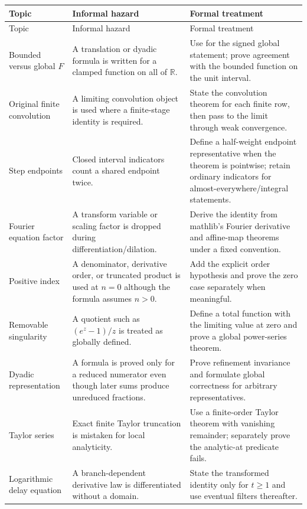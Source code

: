 \documentclass[11pt,oneside]{report}
\theoremstyle{definition}
\theoremstyle{remark}
\DeclareRobustCommand{\lean}[1]{\texorpdfstring{\texttt{\expandafter\seqsplit\expandafter{\detokenize{#1}}}}{\detokenize{#1}}}
\newcommand{\R}{\mathbb{R}}
\begin{document}
\begin{longtable}{>{\raggedright\arraybackslash}p{} >{\raggedright\arraybackslash}p{} >{\raggedright\arraybackslash}p{}}
\toprule
Topic & Informal hazard & Formal treatment \\
\midrule
\endfirsthead
\toprule
Topic & Informal hazard & Formal treatment \\
\midrule
\endhead
Bounded versus global \(F\) & A translation or dyadic formula is written for a clamped function on all of \(\R\). & Use \lean{extendedFabius} for the signed global statement; prove agreement with the bounded function on the unit interval. \\
Original finite convolution & A limiting convolution object is used where a finite-stage identity is required. & State the convolution theorem for each finite row, then pass to the limit through weak convergence. \\
Step endpoints & Closed interval indicators count a shared endpoint twice. & Define a half-weight endpoint representative when the theorem is pointwise; retain ordinary indicators for almost-everywhere/integral statements. \\
Fourier equation factor & A transform variable or scaling factor is dropped during differentiation/dilation. & Derive the identity from mathlib's Fourier derivative and affine-map theorems under a fixed convention. \\
Positive index & A denominator, derivative order, or truncated product is used at \(n=0\) although the formula assumes \(n>0\). & Add the explicit order hypothesis and prove the zero case separately when meaningful. \\
Removable singularity & A quotient such as \((e^z-1)/z\) is treated as globally defined. & Define a total function with the limiting value at zero and prove a global power-series theorem. \\
Dyadic representation & A formula is proved only for a reduced numerator even though later sums produce unreduced fractions. & Prove refinement invariance and formulate global correctness for arbitrary representatives. \\
Taylor series & Exact finite Taylor truncation is mistaken for local analyticity. & Use a finite-order Taylor theorem with vanishing remainder; separately prove the analytic-at predicate fails. \\
Logarithmic delay equation & A branch-dependent derivative law is differentiated without a domain. & State the transformed identity only for \(t\geq1\) and use eventual filters thereafter. \\

\end{longtable}
\end{document}
